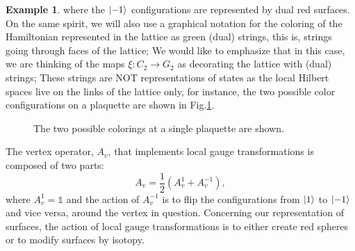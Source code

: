 \documentclass[a4paper,11pt]{article}
\theoremstyle{plain}%
\theoremstyle{definition}
\newtheorem{exmp}[thm]{Example}
\theoremstyle{remark}
\begin{document}
\begin{exmp}
where the $\ket{-1}$ configurations are represented by dual red surfaces. On the same spirit, we will also use a graphical notation for the coloring of the Hamiltonian  represented in the lattice as green (dual) strings, this is, strings going through faces of the lattice; We would like to emphasize that in this case, we are thinking of the maps $\xi:C_2 \rightarrow G_2$ as decorating the lattice with (dual) strings; These strings are NOT representations of states as the local Hilbert spaces live on the links of the lattice only, for instance, the two possible color configurations on a plaquette are shown in Fig.\ref{fig:plaqconfig}.

\begin{figure}[h!]
\centering
{}\hspace{30pt}
\caption{\label{fig:plaqconfig} The two possible colorings at a single plaquette are shown.}
\end{figure}

The vertex operator, $A_v$, that implements local gauge transformations is composed of two parts: 
\[A_v=\dfrac{1}{2}(A_v^{1}+A_v^{-1}),\]
where $A_v^1=\mathbb{1}$ and the action of $A_v^{-1}$ is to flip the configurations from $\ket{1}$ to $\ket{-1}$ and vice versa, around the vertex in question. Concerning our representation of surfaces, the action of local gauge transformations is to either create red spheres or to modify surfaces by isotopy. 


\end{exmp}
\end{document}
